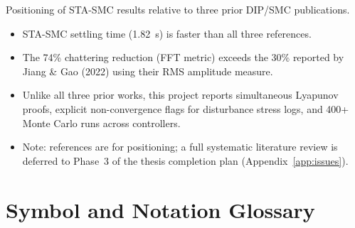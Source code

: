 \documentclass[10pt, a4paper]{article}
\begin{document}
Positioning of STA-SMC results relative to three prior DIP/SMC publications.

\begin{center}
\end{center}

\begin{itemize}[leftmargin=1.5em,itemsep=0.2em]
  \item STA-SMC settling time (1.82~s) is faster than all three references.
  \item The 74\% chattering reduction (FFT metric) exceeds the 30\% reported by
  Jiang \& Gao (2022) using their RMS amplitude measure.
  \item Unlike all three prior works, this project reports simultaneous Lyapunov
  proofs, explicit non-convergence flags for disturbance stress logs, and 400+ Monte
  Carlo runs across controllers.
  \item Note: references are for positioning; a full systematic literature review
  is deferred to Phase~3 of the thesis completion plan (Appendix~\ref{app:issues}).
\end{itemize}

\section{Symbol and Notation Glossary}
\label{app:glossary}
\end{document}

